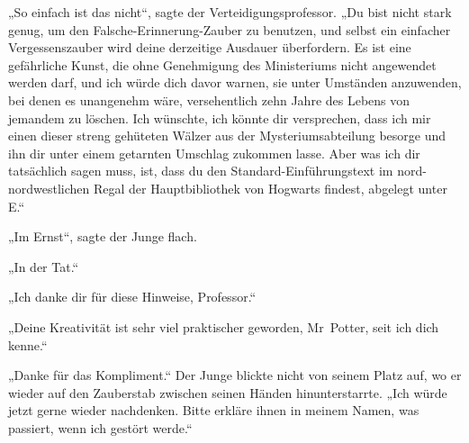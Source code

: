 „So einfach ist das nicht“, sagte der Verteidigungsprofessor. „Du bist nicht stark genug, um den Falsche-Erinnerung-Zauber zu benutzen, und selbst ein einfacher Vergessenszauber wird deine derzeitige Ausdauer überfordern. Es ist eine gefährliche Kunst, die ohne Genehmigung des Ministeriums nicht angewendet werden darf, und ich würde dich davor warnen, sie unter Umständen anzuwenden, bei denen es unangenehm wäre, versehentlich zehn Jahre des Lebens von jemandem zu löschen. Ich wünschte, ich könnte dir versprechen, dass ich mir einen dieser streng gehüteten Wälzer aus der Mysteriumsabteilung besorge und ihn dir unter einem getarnten Umschlag zukommen lasse. Aber was ich dir tatsächlich sagen muss, ist, dass du den Standard-Einführungstext im nord-nordwestlichen Regal der Hauptbibliothek von Hogwarts findest, abgelegt unter E.“

„Im Ernst“, sagte der Junge flach.

„In der Tat.“

„Ich danke dir für diese Hinweise, Professor.“

„Deine Kreativität ist sehr viel praktischer geworden, Mr~Potter, seit ich dich kenne.“

„Danke für das Kompliment.“
Der Junge blickte nicht von seinem Platz auf, wo er wieder auf den Zauberstab zwischen seinen Händen hinunterstarrte.
„Ich würde jetzt gerne wieder nachdenken. Bitte erkläre ihnen in meinem Namen, was passiert, wenn ich gestört werde.“

